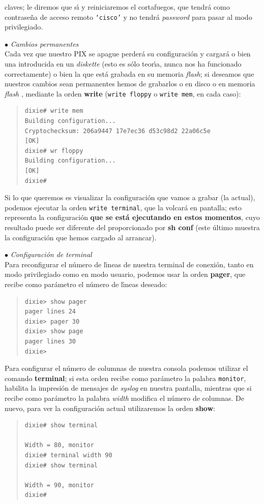 claves; le diremos que s\'{\i} y reiniciaremos el cortafuegos, que tendr\'a 
como contrase\~na de acceso remoto {\tt `cisco'} y no tendr\'a {\it password}
para pasar al modo privilegiado.
\par{$\bullet$ {\it Cambios permanentes}}\\
Cada vez que nuestro PIX se apague perder\'a su configuraci\'on y cargar\'a o bien una introducida en un {\it diskette} (esto es
s\'olo teor\'{\i}a, nunca nos ha funcionado correctamente) o bien la 
que est\'a grabada en su memoria {\it flash}; si deseamos que nuestros cambios sean permanentes hemos de grabarlos o en disco o en 
memoria {\it flash} , mediante la orden {\bf write} ({\tt write floppy} o {\tt write mem}, en cada caso):
\begin{quote}
\begin{verbatim}
dixie# write mem
Building configuration...
Cryptochecksum: 206a9447 17e7ec36 d53c98d2 22a06c5e
[OK]
dixie# wr floppy
Building configuration...
[OK]
dixie#
\end{verbatim}
\end{quote}
Si lo que queremos es visualizar la configuraci\'on que vamos a grabar (la 
actual), podemos ejecutar la orden {\tt write terminal}, que la volcar\'a en 
pantalla; esto representa la configuraci\'on {\bf que se est\'a ejecutando en
estos momentos}, cuyo resultado puede ser diferente del proporcionado por {\bf 
sh conf} (este \'ultimo muestra la configuraci\'on que hemos cargado al
arrancar).
\par{$\bullet$ {\it Configuraci\'on de terminal}}\\
Para reconfigurar el n\'umero de l\'{\i}neas de nuestra terminal de conexi\'on, tanto en modo privilegiado como en modo usuario, 
podemos usar la orden {\bf pager}, que recibe como par\'ametro el n\'umero de l\'{\i}neas deseado:
\begin{quote}
\begin{verbatim}
dixie> show pager
pager lines 24
dixie> pager 30
dixie> show page
pager lines 30
dixie>
\end{verbatim}
\end{quote}
Para configurar el n\'umero de columnas de nuestra consola podemos utilizar el 
comando {\bf terminal}; si esta orden recibe
como par\'ametro la palabra {\tt monitor}, habilita la impresi\'on de mensajes de {\it syslog} en nuestra pantalla, mientras que 
si recibe como par\'ametro la palabra {\it width} modifica el n\'umero de columnas. De nuevo, para ver la configuraci\'on actual
utilizaremos la orden {\bf show}: 
\begin{quote}
\begin{verbatim}
dixie# show terminal

Width = 80, monitor
dixie# terminal width 90
dixie# show terminal

Width = 90, monitor
dixie#
\end{verbatim}
\end{quote}
